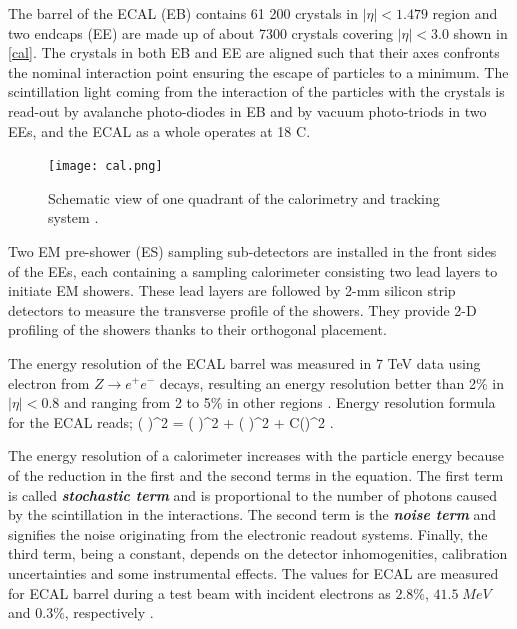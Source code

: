 The barrel of the ECAL (EB) contains 61 200 crystals in $|\eta|<1.479$ region and two endcaps (EE) are made up of about 7300 crystals covering $|\eta|<3.0$ shown in \autoref{cal}. The crystals in both EB and EE are aligned such that their axes confronts the nominal interaction point ensuring the escape of particles to a minimum. The scintillation light coming from the interaction of the particles with the crystals is read-out by avalanche photo-diodes in EB and by vacuum photo-triods in two EEs, and the ECAL as a whole operates at 18 \textdegree C.

\begin{figure}[ht]
	\centering
	\texttt{[image: cal.png]}
	\vspace{2mm}
	\caption[Schematic view showing one quadrant of the calorimetry and tracking system.]{Schematic view of one quadrant of the calorimetry and tracking system \cite{CERN-LHCC-97-033}.}
	\label{cal}
\end{figure}

Two EM pre-shower (ES) sampling sub-detectors are installed in the front sides of the EEs, each containing a sampling calorimeter consisting two lead layers to initiate EM showers. These lead layers are followed by 2-mm silicon strip detectors to measure the transverse profile of the showers. They provide 2-D profiling of the showers thanks to their orthogonal placement.

The energy resolution of the ECAL barrel was measured in 7 TeV data using electron from $Z \rightarrow e^+e^-$ decays, resulting an energy resolution better than 2\% in $|\eta|<0.8$ and ranging from 2 to 5\% in other regions \cite{ecalm}. Energy resolution formula for the ECAL reads;
\be
\left( \right)^2 = \left( \right)^2 + \left( \right)^2 + C\left(\eta\right)^2 \; .
\label{res_eq_ecal}
\ee

The energy resolution of a calorimeter increases with the particle energy because of the reduction in the first and the second terms in the equation. The first term is called \emph{\bf{stochastic term}} and is proportional to the number of photons caused by the scintillation in the interactions. The second term is the \emph{\bf{noise term}} and signifies the noise originating from the electronic readout systems. Finally, the third term, being a constant, depends on the detector inhomogenities, calibration uncertainties and some instrumental effects. The values for ECAL are measured for ECAL barrel during a test beam with incident electrons as $2.8\%$, $41.5 \; MeV$ and $0.3\%$, respectively \cite{Ingram2007}.

